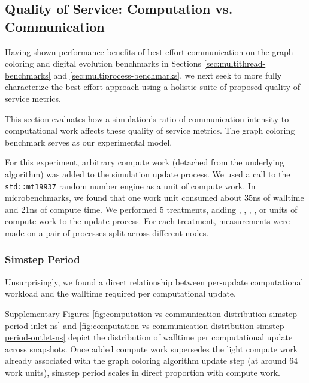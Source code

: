 \subsection{Quality of Service: Computation vs. Communication}
\label{sec:computation-vs-communication}

Having shown performance benefits of best-effort communication on the graph coloring and digital evolution benchmarks in Sections \ref{sec:multithread-benchmarks} and \ref{sec:multiprocess-benchmarks}, we next seek to more fully characterize the best-effort approach using a holistic suite of proposed quality of service metrics.

This section evaluates how a simulation's ratio of communication intensity to computational work affects these quality of service metrics.
The graph coloring benchmark serves as our experimental model.

For this experiment, arbitrary compute work (detached from the underlying algorithm) was added to the simulation update process.
We used a call to the \texttt{std::mt19937} random number engine as a unit of compute work.
In microbenchmarks, we found that one work unit consumed about 35ns of walltime and 21ns of compute time.
We performed 5 treatments, adding , , , , or  units of compute work to the update process.
For each treatment, measurements were made on a pair of processes split across different nodes.

\subsubsection{Simstep Period}

Unsurprisingly, we found a direct relationship between per-update computational workload and the walltime required per computational update.

Supplementary Figures \ref{fig:computation-vs-communication-distribution-simstep-period-inlet-ns} and \ref{fig:computation-vs-communication-distribution-simstep-period-outlet-ns} depict the distribution of walltime per computational update across snapshots.
Once added compute work supersedes the light compute work already associated with the graph coloring algorithm update step (at around 64 work units), simstep period scales in direct proportion with compute work.

